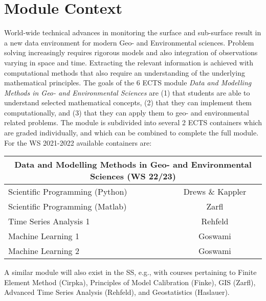 \documentclass[letterpaper]{inzane_syllabus} %
\begin{document}

\makeprofile %

\section{Module Context}

World-wide technical advances in monitoring the surface and sub-surface result in a new data environment for modern Geo- and Environmental sciences. Problem solving increasingly requires rigorous models and also integration of observations varying in space and time. Extracting the relevant information is achieved with computational methods that also require an understanding of the underlying mathematical principles. The goals of the 6 ECTS module \textit{Data and Modelling Methods in Geo- and Environmental Sciences} are (1) that students are able to understand selected mathematical concepts, (2) that they can implement them computationally, and (3) that they can apply them to geo- and environmental related problems. The module is subdivided into several 2 ECTS containers which are graded individually, and which can be combined to complete the full module. For the WS 2021-2022 available containers are:
\setlength{\tabcolsep}{0.1em}
\begin{center}
\begin{tabular}{l c}
 \multicolumn{2}{c}{{\color{myCOLOR}Data and Modelling Methods in Geo- and Environmental Sciences (WS 22/23)}} \\
 \hline
 {\color{blue} Scientific Programming (Python)} & {\color{blue}Drews \& Kappler} \\ 
 Scientific Programming (Matlab)   & Zarfl \\
 Time Series Analysis 1  & Rehfeld \\
 Machine Learning 1  & Goswami \\ 
 Machine Learning 2  & Goswami \\
\end{tabular}
\end{center}
A similar module will also exist in the SS, e.g., with courses pertaining to Finite Element Method (Cirpka), Principles of Model Calibration (Finke), GIS (Zarfl), Advanced Time Series Analysis (Rehfeld), and Geostatistics (Haslauer). 
\end{document}
